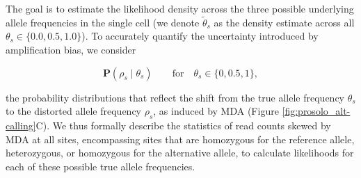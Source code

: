 \documentclass[12pt,inline]{wlscirep}
\begin{document}
The goal is to estimate the likelihood density across the three possible underlying allele frequencies in the single cell (we denote $\tilde{\theta}_s$ as the density estimate across all $\theta_s\in\{0.0,0.5,1.0\}$).
To accurately quantify the uncertainty introduced by amplification bias, we consider  

\begin{equation}
 \mathbf{P}(\rho_s\mid\theta_s)\qquad \text{for}  \quad\theta_s\in\{0,0.5,1\},
\end{equation}

the probability distributions that reflect the shift from the true allele frequency $\theta_s$ to the distorted allele frequency $\rho_s$, as induced by MDA (Figure \ref{fig:prosolo_alt-calling}C).
We thus formally describe the statistics of read counts skewed by MDA at all sites, encompassing sites that are homozygous for the reference allele, heterozygous, or homozygous for the alternative allele, to calculate likelihoods for each of these possible true allele frequencies.
\end{document}
